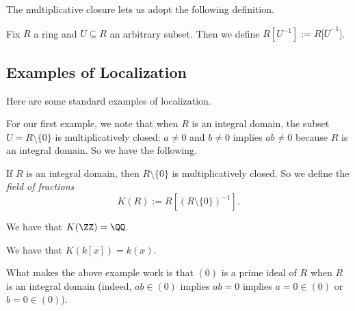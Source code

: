 The multiplicative closure lets us adopt the following definition.
\begin{definition}
	Fix $R$ a ring and $U\subseteq R$ an arbitrary subset. Then we define $R\left[U^{-1}\right]:=R\big[\overline U^{-1}\big]$.
\end{definition}

\subsection{Examples of Localization}
Here are some standard examples of localization.

For our first example, we note that when $R$ is an integral domain, the subset $U=R\setminus\{0\}$ is multiplicatively closed: $a\ne0$ and $b\ne0$ implies $ab\ne0$ because $R$ is an integral domain. So we have the following.
\begin{definition}
	If $R$ is an integral domain, then $R\setminus\{0\}$ is multiplicatively closed. So we define the \textit{field of fractions}
	\[K(R):=R\left[(R\setminus\{0\})^{-1}\right].\]
\end{definition}
\begin{example}
	We have that $K(\ZZ)=\QQ$.
\end{example}
\begin{example}
	We have that $K(k[x])=k(x)$.
\end{example}
What makes the above example work is that $(0)$ is a prime ideal of $R$ when $R$ is an integral domain (indeed, $ab\in(0)$ implies $ab=0$ implies $a=0\in(0)$ or $b=0\in(0)$).

